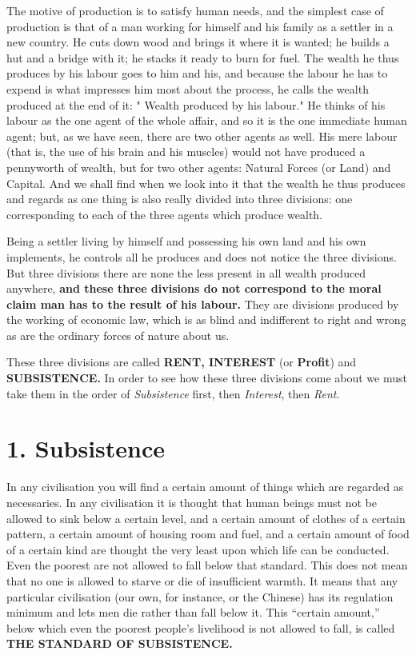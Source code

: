 \documentclass{book}
\begin{document}
The motive of production is to satisfy human needs, and the simplest case of production is that of a man working for himself and his family as a settler in a new country. He cuts down wood and brings it where it is wanted; he builds a hut and a bridge with it; he stacks it ready to burn for fuel. The wealth he thus produces by his labour goes to him and his, and because the labour he has to expend is what impresses him most about the process, he calls the wealth produced at the end of it: " Wealth produced by his labour." He thinks of his labour as the one agent of the whole affair, and so it is the one immediate human agent; but, as we have seen, there are two other agents as well. His mere labour (that is, the use of his brain and his muscles) would not have produced a pennyworth of wealth, but for two other agents: Natural Forces (or Land) and Capital. And we shall find when we look into it that the wealth he thus produces and regards as one thing is also really divided into three divisions: one corresponding to each of the three agents which produce wealth.

Being a settler living by himself and possessing his own land and his own implements, he controls all he produces and does not notice the three divisions. But three divisions there are none the less present in all wealth produced anywhere, \textbf{and these three divisions do not correspond to the moral claim man has to the result of his labour.} They are divisions produced by the working of economic law, which is as blind and indifferent to right and wrong as are the ordinary forces of nature about us.

These three divisions are called \textbf{RENT, INTEREST} (or \textbf{Profit}) and \textbf{SUBSISTENCE.} In order to see how these three divisions come about we must take them in the order of \emph{Subsistence} first, then \emph{Interest}, then \emph{Rent}.

\section{1. Subsistence}
In any civilisation you will find a certain amount of things which are regarded as necessaries. In any civilisation it is thought that human beings must not be allowed to sink below a certain level, and a certain amount of clothes of a certain pattern, a certain amount of housing room and fuel, and a certain amount of food of a certain kind are thought the very least upon which life can be conducted. Even the poorest are not allowed to fall below that standard. This does not mean that no one is allowed to starve or die of insufficient warmth. It means that any particular civilisation (our own, for instance, or the Chinese) has its regulation minimum and lets men die rather than fall below it. This “certain amount,” below which even the poorest people’s livelihood is not allowed to fall, is called \textbf{THE STANDARD OF SUBSISTENCE.}
\end{document}
